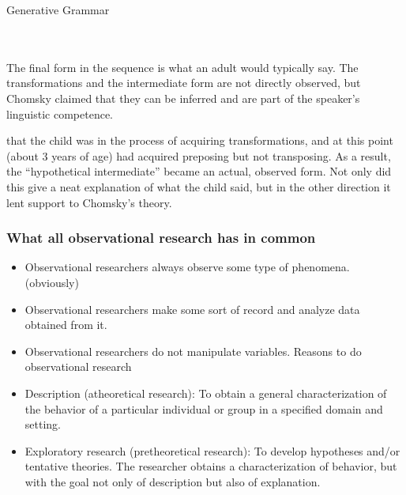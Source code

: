 \begin{refsection}
\begin{apatextbox}{Generative Grammar}
 \\  \\ 
\end{apatextbox}

The final form in the sequence is what an adult would typically say. The transformations and the intermediate form are not directly observed, but Chomsky claimed that they can be inferred and are part of the speaker’s linguistic competence.

 that the child was in the process of acquiring transformations, and at this point (about 3 years of age) had acquired preposing but not transposing. As a result, the “hypothetical intermediate” became an actual, observed form. Not only did this give a neat explanation of what the child said, but in the other direction it lent support to Chomsky’s theory. ~\citep{Brown:1972to} ~\citep{Chomsky:1965uu}

\subsubsection{What all observational research has in common}
\label{whatallobservationalresearchhasincommon}

\begin{itemize}
\item Observational researchers always observe some type of phenomena. (obviously)

\item Observational researchers make some sort of record and analyze data obtained from it.

\item Observational researchers do not manipulate variables.
Reasons to do observational research

\item Description (atheoretical research): To obtain a general characterization of the behavior of a particular individual or group in a specified domain and setting.

\item Exploratory research (pretheoretical research): To develop hypotheses and\slash or tentative theories. The researcher obtains a characterization of behavior, but with the goal not only of description but also of explanation.


\end{itemize}
\end{refsection}
